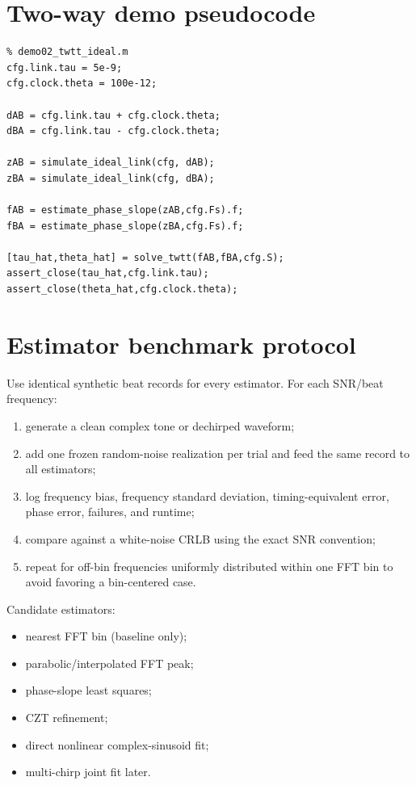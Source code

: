 \documentclass[11pt]{article}
\begin{document}
\section{Two-way demo pseudocode}
\begin{verbatim}
% demo02_twtt_ideal.m
cfg.link.tau = 5e-9;
cfg.clock.theta = 100e-12;

dAB = cfg.link.tau + cfg.clock.theta;
dBA = cfg.link.tau - cfg.clock.theta;

zAB = simulate_ideal_link(cfg, dAB);
zBA = simulate_ideal_link(cfg, dBA);

fAB = estimate_phase_slope(zAB,cfg.Fs).f;
fBA = estimate_phase_slope(zBA,cfg.Fs).f;

[tau_hat,theta_hat] = solve_twtt(fAB,fBA,cfg.S);
assert_close(tau_hat,cfg.link.tau);
assert_close(theta_hat,cfg.clock.theta);
\end{verbatim}

\section{Estimator benchmark protocol}
Use identical synthetic beat records for every estimator. For each SNR/beat frequency:
\begin{enumerate}
\item generate a clean complex tone or dechirped waveform;
\item add one frozen random-noise realization per trial and feed the same record to all estimators;
\item log frequency bias, frequency standard deviation, timing-equivalent error, phase error, failures, and runtime;
\item compare against a white-noise CRLB using the exact SNR convention;
\item repeat for off-bin frequencies uniformly distributed within one FFT bin to avoid favoring a bin-centered case.
\end{enumerate}

Candidate estimators:
\begin{itemize}
\item nearest FFT bin (baseline only);
\item parabolic/interpolated FFT peak;
\item phase-slope least squares;
\item CZT refinement;
\item direct nonlinear complex-sinusoid fit;
\item multi-chirp joint fit later.
\end{itemize}
\end{document}
